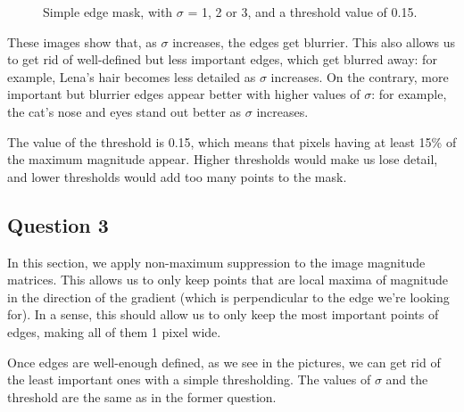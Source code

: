 \documentclass[a4paper]{article}
\begin{document}
\begin{figure}[h]
\begin{subfigure}{0.33\textwidth}
\end{subfigure}

\caption{Simple edge mask, with $\sigma $ = 1, 2 or 3, and a threshold value of 0.15.}

\end{figure}

These images show that, as $\sigma$ increases, the edges get blurrier.
This also allows us to get rid of well-defined but less important edges, which get blurred away: for example, Lena's hair becomes less detailed as $\sigma$ increases.
On the contrary, more important but blurrier edges appear better with higher values of $\sigma$: for example, the cat's nose and eyes stand out better as $\sigma$ increases.

The value of the threshold is 0.15, which means that pixels having at least 15\% of the maximum magnitude appear. Higher thresholds would make us lose detail, and lower thresholds would add too many points to the mask.

\FloatBarrier

\subsection*{Question 3}

In this section, we apply non-maximum suppression to the image magnitude matrices.
This allows us to only keep points that are local maxima of magnitude in the direction of the gradient (which is perpendicular to the edge we're looking for).
In a sense, this should allow us to only keep the most important points of edges, making all of them 1 pixel wide.

Once edges are well-enough defined, as we see in the pictures, we can get rid of the least important ones with a simple thresholding.
The values of $\sigma$ and the threshold are the same as in the former question.
\end{document}
